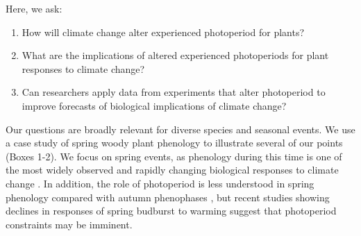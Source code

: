 \documentclass{article}
\begin{document}
\par Here, we ask: 
\begin{enumerate}
\item How will climate change alter experienced photoperiod for plants? 
\item What are the implications of altered experienced photoperiods for plant responses to climate change?
\item Can researchers apply data from experiments that alter photoperiod to improve forecasts of biological implications of climate change?

\end{enumerate}
\par Our questions are broadly relevant for diverse species and seasonal events. We use a case study of spring woody plant phenology to illustrate several of our points (Boxes 1-2). We focus on spring events, as phenology during this time is one of the most widely observed and rapidly changing biological responses to climate change \citep{parmesan2006}. In addition, the role of photoperiod is less understood in spring phenology compared with autumn phenophases \citep[reviewed in, e.g.,][]{azeez2015,gallinat2015,lagercrantz2009, allona2008}, but recent studies showing declines in responses of spring budburst to warming \citep[e.g.,][]{fu2019,gusewell2017,yu2010} suggest that photoperiod constraints may be imminent. 
\end{document}

